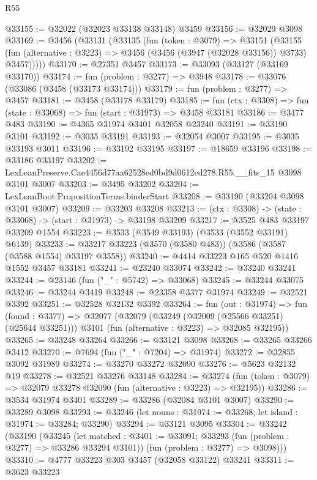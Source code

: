 \begin{lexlean}{R55}
\begin{coremodule}
@33155 := @32022 (@32023 @33138 @33148) @3459
@33156 := @32029 @3098
@33169 := @3456
    (@33131
      (@33135
        (fun (token : @3079) =>
        @33151
          (@33155
            (fun (alternative : @3223) => @3456 (@3456 (@3947 (@32028 @33156)) @3733) @3457)))))
@33170 := @27351 @3457
@33173 := @33093 (@33127 (@33169 @33170))
@33174 := fun (problem : @3277) => @3948
@33178 := @33076 (@33086 (@3458 (@33173 @33174)))
@33179 := fun (problem : @3277) => @3457
@33181 := @3458 (@33178 @33179)
@33185 := fun (ctx : @3308) => fun (state : @33068) => fun (start : @31973) => @3458 @33181
@33186 := @3477 @483
@33190 := @4365 @31974 @3401 @32058 @23240
@33191 := @33190 @3101
@33192 := @3035 @33191
@33193 := @32054 @3007
@33195 := @3035 @33193 @3011
@33196 := @33192 @33195
@33197 := @18659 @33196
@33198 := @33186 @33197
@33202 := LexLeanPreserve.Cae4456d77aa62528ed0bd9d0612cd278.R55.__fits_15 @3098 @3101 @3007
@33203 := @3495 @33202
@33204 := LexLeanBoot.PropositionTerms.binderStart
@33208 := @33190 (@33204 @3098 @3101 @3007)
@33209 := @33203 @33208
@33213 := (ctx : @3308) -> (state : @33068) -> (start : @31973) -> @33198 @33209
@33217 := @3525 @483 @33197 @33209 @1554
@33223 := @3533 (@3549 @33193) (@3533 (@3552 @33191) @6139)
@33233 := @33217 @33223 (@3570 (@3580 @483)) (@3586 (@3587 (@3588 @1554) @33197 @3558))
@33240 := @4414 @33223 @165 @520 @1416 @1552 @3457 @33181
@33241 := @23240 @33074
@33242 := @33240 @33241
@33244 := @23146 (fun ("_" : @5742) => @33068)
@33245 := @33244 @33075
@33246 := @33244 @3419
@33248 := @23358 @3377 @31974
@33249 := @32521 @3392
@33251 := @32528 @32132 @3392
@33264 := fun (out : @31974) =>
  fun (found : @3377) =>
  @32077
    (@32079
      (@33249 (@32009 (@25566 @33251) (@25644 @33251)))
      @3101
      (fun (alternative : @3223) => @32085 @32195))
@33265 := @33248 @33264
@33266 := @33121 @3098
@33268 := @33265 @33266 @3412
@33270 := @7694 (fun ("_" : @7204) => @31974)
@33272 := @32855 @3092 @31989
@33274 := @33270 @33272 @32090
@33276 := @5623 @32132 @19
@33278 := @32521 @33276 @33148
@33284 := @33274 (fun (token : @3079) => @32079 @33278 @32090 (fun (alternative : @3223) => @32195))
@33286 := @3534 @31974 @3401
@33289 := @33286 (@32084 @3101 @3007)
@33290 := @33289 @3098
@33293 := @33246 (let nouns : @31974 := @33268; let island : @31974 := @33284; @33290)
@33294 := @33121 @3095
@33304 := @33242
    (@33190
      (@33245
        (let matched : @3401 := @33091; @33293 (fun (problem : @3277) => @33286 @33294 @3101))
        (fun (problem : @3277) => @3098)))
@33310 := @4777 @33223 @303 @3457 (@32058 @33122) @33241
@33311 := @3623 @33223

\end{coremodule}
\end{lexlean}
